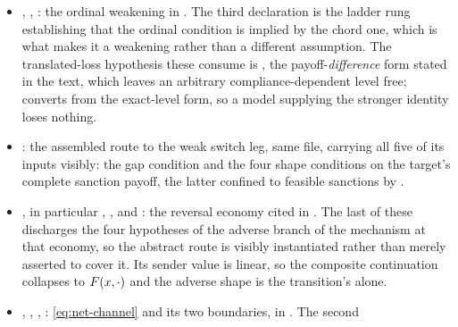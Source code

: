\begin{itemize}[leftmargin=1.4em,itemsep=1pt]
,
: the chord mechanism of
, in .
Stated over an abstract loss, perturbation and action set, with no reference to
the sanctions model.   and
 record curvature as a discharger rather than
as the hypothesis.
\item {}, ,
: the ordinal weakening in
.  The third
declaration is the ladder rung establishing that the ordinal condition is
implied by the chord one, which is what makes it a weakening rather than a
different assumption.  The translated-loss hypothesis these consume is
, the payoff-\emph{difference} form
stated in the text, which leaves an arbitrary compliance-dependent level free;
 converts from the exact-level form,
so a model supplying the stronger identity loses nothing.
\item {}:
the assembled route to the weak switch leg, same file, carrying all five of its
inputs visibly: the gap condition and the four shape conditions on the target's
complete sanction payoff, the latter confined to feasible sanctions by
.
\item {}, in particular
, ,
 and
: the reversal economy cited in
.  The last of these discharges the four hypotheses of
the adverse branch of the mechanism at that economy, so the abstract route is
visibly instantiated rather than merely asserted to cover it.  Its sender value
is linear, so the composite continuation collapses to $F(x,\cdot)$ and the
adverse shape is the transition's alone.
\item {},
,
,
:
\eqref{eq:net-channel} and its two boundaries, in
.  The second

\end{itemize}
